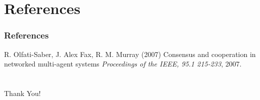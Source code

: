 \documentclass{beamer}
\begin{document}
\section{References}

\begin{frame}
\frametitle{References}
\footnotesize{
\begin{thebibliography}{99} %

 R. Olfati-Saber, J. Alex Fax, R. M. Murray (2007)
\newblock Consensus and cooperation in networked multi-agent systems
\newblock \emph{Proceedings of the IEEE, 95.1 215-233}, 2007.

\end{thebibliography}
}
\end{frame}

\section{}
\begin{frame}
\begin{center}
\Huge {Thank You!}
\end{center}
\end{frame}

\end{document}
